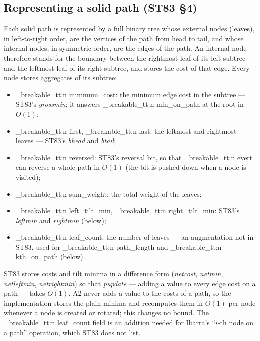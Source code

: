 \documentclass[11pt,a4paper,oneside]{report}
\theoremstyle{plain}
\theoremstyle{definition}
\theoremstyle{remark}
\DeclareRobustCommand{\code}[1]{\mtp_breakable_tt:n {#1}}
\begin{document}
\subsection{Representing a solid path (ST83 \S4)}
Each solid path is represented by a full binary tree whose external nodes (leaves), in
left-to-right order, are the vertices of the path from head to tail, and whose internal nodes,
in symmetric order, are the edges of the path. An internal node therefore stands for the
boundary between the rightmost leaf of its left subtree and the leftmost leaf of its right
subtree, and stores the cost of that edge. Every node stores aggregates of its subtree:
\begin{itemize}
\item \code{minimum_cost}: the minimum edge cost in the subtree --- ST83's \emph{grossmin};
  it answers \code{min_on_path} at the root in \(O(1)\);
\item \code{first}, \code{last}: the leftmost and rightmost leaves --- ST83's \emph{bhead}
  and \emph{btail};
\item \code{reversed}: ST83's reversal bit, so that \code{evert} can reverse a whole path in
  \(O(1)\) (the bit is pushed down when a node is visited);
\item \code{sum_weight}: the total weight of the leaves;
\item \code{left_tilt_min}, \code{right_tilt_min}: ST83's \emph{leftmin} and \emph{rightmin}
  (below);
\item \code{leaf_count}: the number of leaves --- an augmentation not in ST83, used for
  \code{path_length} and \code{kth_on_path} (below).
\end{itemize}

\begin{caution}
ST83 stores costs and tilt minima in a difference form (\emph{netcost}, \emph{netmin},
\emph{netleftmin}, \emph{netrightmin}) so that \emph{pupdate} --- adding a value to every edge
cost on a path --- takes \(O(1)\). A2 never adds a value to the costs of a path, so the
implementation stores the plain minima and recomputes them in \(O(1)\) per node whenever a node
is created or rotated; this changes no bound. The \code{leaf_count} field is an addition needed
for Ibarra's ``\(i\)-th node on a path'' operation, which ST83 does not list.
\end{caution}
\end{document}
